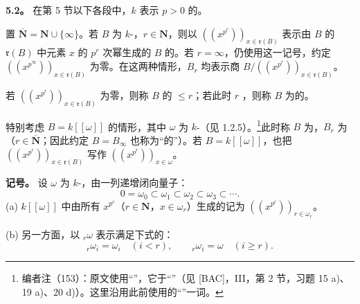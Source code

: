 \textbf{5.2。} 在第 5 节以下各段中，$k$ 表示 $p>0$ 的。

置 $\overline{\mathbf N}=\mathbf N\cup\{\infty\}$。若 $B$ 为 $k$-，$r\in\mathbf N$，则以 $((x^{p^r}))_{x\in\mathfrak r(B)}$ 表示由 $B$ 的 $\mathfrak r(B)$ 中元素 $x$ 的 $p^r$ 次幂生成的 $B$ 的。若 $r=\infty$，仍使用这一记号，约定 $((x^{p^\infty}))_{x\in\mathfrak r(B)}$ 为零。在这两种情形，$B_r$ 均表示商 $B/((x^{p^r}))_{x\in\mathfrak r(B)}$。

若 $((x^{p^r}))_{x\in\mathfrak r(B)}$ 为零，则称 $B$ 的 $\leq r$；若此时 $r$ ，则称 $B$ 为的。

特别考虑 $B=k[[\omega]]$ 的情形，其中 $\omega$ 为 $k$-（见 1.2.5）。\footnote{编者注（153）：原文使用“”，它于“”（见 [BAC]，III，第 2 节，习题 15 a)、19 a)、20 d)）。这里沿用此前使用的“”一词。}此时称 $B$ 为，$B_r$ 为（$r\in\overline{\mathbf N}$；因此约定 $B=B_\infty$ 也称为“的”）。若 $B=k[[\omega]]$，也把 $((x^{p^r}))_{x\in\mathfrak r(B)}$ 写作 $((x^{p^r}))_{x\in\omega}$。

\textbf{记号。} 设 $\omega$ 为 $k$-，由一列递增闭向量子：
\[0=\omega_0\subset\omega_1\subset\omega_2\subset\omega_3\subset\cdots.\]
(a) $k[[\omega]]$ 中由所有 $x^{p^r}$（$r\in\mathbf N$，$x\in\omega_r$）生成的记为 $((x^{p^r}))_{r\in\omega_r}$。

(b) 另一方面，以 ${}_r\omega$ 表示满足下式的：
\[{}_r\omega_i=\omega_i\quad(i<r),\qquad{}_r\omega_i=\omega\quad(i\geq r).\]

